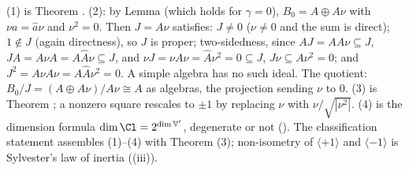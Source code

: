 (1) is Theorem . (2): by Lemma  (which holds for $\gamma = 0$), $B_0 = A \oplus A\nu$ with $\nu a = \hat{a}\nu$ and $\nu^2 = 0$. Then $J = A\nu$ satisfies: $J \neq 0$ ($\nu \neq 0$ and the sum is direct); $1 \notin J$ (again directness), so $J$ is proper; two-sidedness, since $A J = A A \nu \subseteq J$, $J A = A \nu A = A \hat{A} \nu \subseteq J$, and $\nu J = \nu A \nu = \hat{A} \nu^2 = 0 \subseteq J$, $J\nu \subseteq A\nu^2 = 0$; and $J^2 = A\nu A \nu = A \hat{A} \nu^2 = 0$. A simple algebra has no such ideal. The quotient: $B_0 / J = (A \oplus A\nu)/A\nu \cong A$ as algebras, the projection sending $\nu$ to $0$. (3) is Theorem ; a nonzero square rescales to $\pm 1$ by replacing $\nu$ with $\nu/\sqrt{|\nu^2|}$. (4) is the dimension formula $\dim \Cl = 2^{\dim \mathbb{V}'}$, degenerate or not (). The classification statement assembles (1)--(4) with Theorem (3); non-isometry of $\langle +1\rangle$ and $\langle -1 \rangle$ is Sylvester's law of inertia ((iii)).
